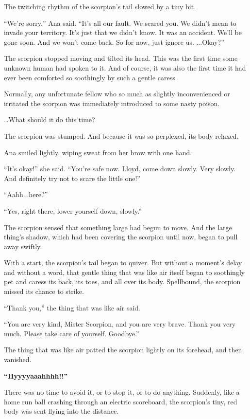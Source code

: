 \documentclass[
]{article}
\begin{document}
The twitching rhythm of the scorpion's tail slowed by a tiny bit.

``We're sorry,'' Ana said. ``It's all our fault. We scared you. We
didn't mean to invade your territory. It's just that we didn't know. It
was an accident. We'll be gone soon. And we won't come back. So for now,
just ignore us. ...Okay?''

The scorpion stopped moving and tilted its head. This was the first time
some unknown human had spoken to it. And of course, it was also the
first time it had ever been comforted so soothingly by such a gentle
caress.

Normally, any unfortunate fellow who so much as slightly inconvenienced
or irritated the scorpion was immediately introduced to some nasty
poison.

\ldots What should it do this time?

The scorpion was stumped. And because it was so perplexed, its body
relaxed.

Ana smiled lightly, wiping sweat from her brow with one hand.

``It's okay!'' she said. ``You're safe now. Lloyd, come down slowly.
Very slowly. And definitely try not to scare the little one!''

``Aahh...here?''

``Yes, right there, lower yourself down, slowly.''

The scorpion sensed that something large had begun to move. And the
large thing's shadow, which had been covering the scorpion until now,
began to pull away swiftly.

With a start, the scorpion's tail began to quiver. But without a
moment's delay and without a word, that gentle thing that was like air
itself began to soothingly pet and caress its back, its toes, and all
over its body. Spellbound, the scorpion missed its chance to strike.

``Thank you,'' the thing that was like air said.

``You are very kind, Mister Scorpion, and you are very brave. Thank you
very much. Please take care of yourself. Goodbye.''

The thing that was like air patted the scorpion lightly on its forehead,
and then vanished.

\textbf{``Hyyyyaaahhhh!!''}

There was no time to avoid it, or to stop it, or to do anything.
Suddenly, like a home run ball crashing through an electric scoreboard,
the scorpion's tiny, red body was sent flying into the distance.
\end{document}
